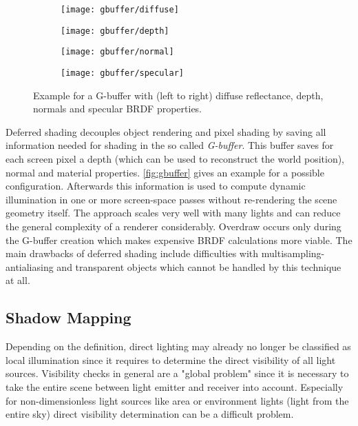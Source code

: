 \documentclass[thesis.tex]{subfiles}
\begin{document}
\begin{figure}[h]
\centering
\begin{subfigure}[b]{0.24\textwidth}
	\texttt{[image: gbuffer/diffuse]}
\end{subfigure}
\begin{subfigure}[b]{0.24\textwidth}
	\texttt{[image: gbuffer/depth]}
\end{subfigure}
\begin{subfigure}[b]{0.24\textwidth}
	\texttt{[image: gbuffer/normal]}
\end{subfigure}
\begin{subfigure}[b]{0.24\textwidth}
	\texttt{[image: gbuffer/specular]}
\end{subfigure}
\caption{Example for a G-buffer with (left to right) diffuse reflectance, depth, normals and specular BRDF properties.} \label{fig:gbuffer}
\end{figure}
Deferred shading decouples object rendering and pixel shading by saving all information needed for shading in the so called \emph{G-buffer}.
This buffer saves for each screen pixel a depth (which can be used to reconstruct the world position), normal and material properties.
\autoref{fig:gbuffer} gives an example for a possible configuration.
Afterwards this information is used to compute dynamic illumination in one or more screen-space passes without re-rendering the scene geometry itself.
The approach scales very well with many lights and can reduce the general complexity of a renderer considerably.
Overdraw occurs only during the G-buffer creation which makes expensive BRDF calculations more viable.
The main drawbacks of deferred shading include difficulties with multisampling-antialiasing and transparent objects which cannot be handled by this technique at all.


\subsection{Shadow Mapping}
Depending on the definition, direct lighting may already no longer be classified as local illumination since it requires to determine the direct visibility of all light sources. 
Visibility checks in general are a "global problem" since it is necessary to take the entire scene between light emitter and receiver into account.
Especially for non-dimensionless light sources like area or environment lights (light from the entire sky) direct visibility determination can be a difficult problem.
\end{document}
